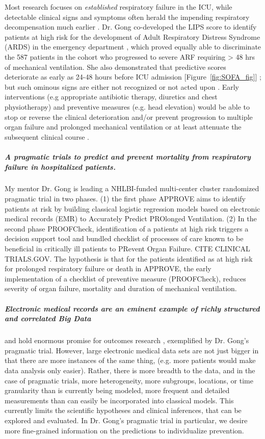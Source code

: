 \documentclass[11pt,notitlepage]{article}
\begin{document}
Most research focuses on \textit{established} respiratory failure in the ICU, while detectable clinical signs and symptoms often herald the impending respiratory decompensation much earlier \cite{Rohde_23401431}. Dr. Gong co-developed the LIPS score to identify patients at high risk for the development of Adult Respiratory Distress Syndrome (ARDS) in the emergency department \cite{Herridge_12594312}, which proved equally able to discriminate the 587 patients in the cohort who progressed to severe ARF requiring > 48 hrs of mechanical ventilation. She also demonstrated that predictive scores deteriorate as early as 24-48 hours before ICU admission  [Figure~\ref{fig:SOFA_fig}] \cite{Yu_24970344}; but such ominous signs are either not recognized or not acted upon \cite{Hillman_12415452,McQuillan_9632403}. Early interventions (e.g appropriate antibiotic therapy, diuretics and chest physiotherapy) and preventive measures (e.g. head elevation) would be able to stop or reverse the clinical deterioration and/or prevent progression to multiple organ failure and prolonged mechanical ventilation or at least attenuate the subsequent clinical course \cite{Naeem_16150531,Rivers_11794169,Rivers_12594312,Mitchell_20378235}. 

\subparagraph{A pragmatic trials to predict and prevent mortality from respiratory failure in hospitalized patients.}  My mentor Dr. Gong is leading a NHLBI-funded multi-center cluster randomized pragmatic trial in two phases. (1) the first phase APPROVE aims to identify patients at risk by building classical logistic regression models based on electronic medical records (EMR) to Accurately Predict PROlonged Ventilation. (2) In the second phase PROOFCheck, identification of a patients at high risk triggers a decision support tool and bundled checklist of processes of care known to be beneficial in critically ill patients to PRevent Organ Failure. CITE CLINICAL TRIALS.GOV. The hypothesis is that for the patients identified as at high risk for prolonged respiratory failure or death in APPROVE, the early implementation of a checklist of preventive measure (PROOFCheck), reduces severity of organ failure, mortality and duration of mechanical ventilation. 

\subparagraph{Electronic medical records are an eminent example of richly structured and correlated Big Data} 
and hold enormous promise for outcomes research \cite{Dean_19279318,Amarasingham20940649},  exemplified by Dr. Gong's pragmatic trial. However, large electronic medical data sets are not just bigger in that there are more instances of the same thing, (e.g. more patients would make data analysis only easier).  Rather, there is more breadth to the data, and in the case of pragmatic trials, more heterogeneity, more subgroups, locations, or time granularity than is currently being modeled, more frequent and detailed measurements than can easily be incorporated into classical models.  This currently limits the scientific hypotheses and clinical inferences, that can be explored and evaluated. In Dr. Gong's pragmatic trial in particular, we desire more fine-grained information on the predictions to individualize prevention.  
\end{document}

